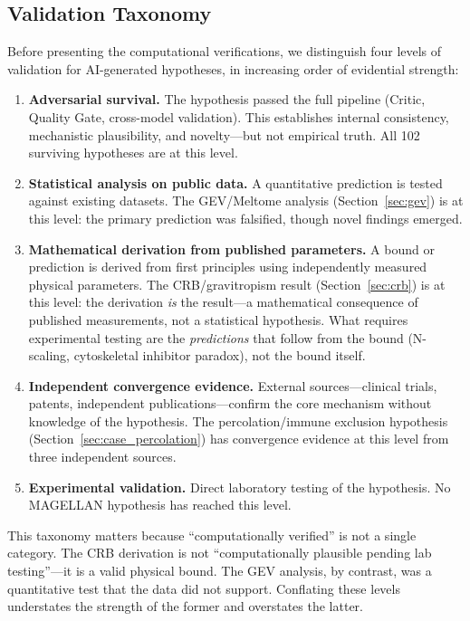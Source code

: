 \subsection{Validation Taxonomy}
\label{sec:validation_taxonomy}

Before presenting the computational verifications, we distinguish four levels of validation for AI-generated hypotheses, in increasing order of evidential strength:

\begin{enumerate}
    \item \textbf{Adversarial survival.} The hypothesis passed the full pipeline (Critic, Quality Gate, cross-model validation). This establishes internal consistency, mechanistic plausibility, and novelty---but not empirical truth. All 102 surviving hypotheses are at this level.
    \item \textbf{Statistical analysis on public data.} A quantitative prediction is tested against existing datasets. The GEV/Meltome analysis (Section~\ref{sec:gev}) is at this level: the primary prediction was falsified, though novel findings emerged.
    \item \textbf{Mathematical derivation from published parameters.} A bound or prediction is derived from first principles using independently measured physical parameters. The CRB/gravitropism result (Section~\ref{sec:crb}) is at this level: the derivation \emph{is} the result---a mathematical consequence of published measurements, not a statistical hypothesis. What requires experimental testing are the \emph{predictions} that follow from the bound (N-scaling, cytoskeletal inhibitor paradox), not the bound itself.
    \item \textbf{Independent convergence evidence.} External sources---clinical trials, patents, independent publications---confirm the core mechanism without knowledge of the hypothesis. The percolation/immune exclusion hypothesis (Section~\ref{sec:case_percolation}) has convergence evidence at this level from three independent sources.
    \item \textbf{Experimental validation.} Direct laboratory testing of the hypothesis. No MAGELLAN hypothesis has reached this level.
\end{enumerate}

This taxonomy matters because ``computationally verified'' is not a single category. The CRB derivation is not ``computationally plausible pending lab testing''---it is a valid physical bound. The GEV analysis, by contrast, was a quantitative test that the data did not support. Conflating these levels understates the strength of the former and overstates the latter.

